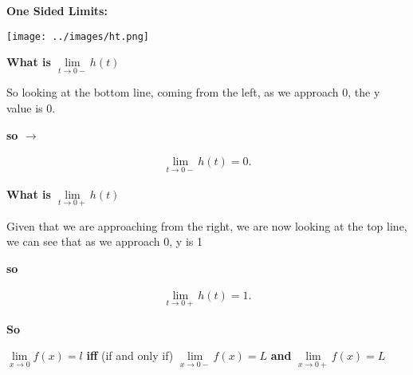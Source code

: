 \documentclass{report}
\begin{document}
    \pagebreak
    \begin{large}
        \noindent \textbf{One Sided Limits:}
    \end{large}
   
    
    \bigbreak \noindent 
    \begin{center}
        \texttt{[image: ../images/ht.png]} 
    \end{center}

    \bigbreak \noindent \bigbreak \noindent 
    \bigbreak \noindent 
    \textbf{What is $\lim\limits_{t \to 0- }{h \left(t\right)}$}

    \bigbreak \noindent 
    So looking at the bottom line, coming from the left, as we approach 0, the y value is 
    0.

    \bigbreak \noindent 
    \textbf{so $\rightarrow$}

    \begin{align*}
        \lim\limits_{t \to 0- }{h \left(t\right) = 0}
    .\end{align*}


    \bigbreak \noindent 
    \textbf{What is $\lim\limits_{t \to 0+}{h \left(t\right)}$} 

    \bigbreak \noindent 
    Given that we are approaching from the right, we are now looking at the top line, 
    we can see that as we approach 0, y is 1

    \bigbreak \noindent 
    \textbf{so}

    \begin{align*}
        \lim\limits_{t \to 0+ }{h \left(t\right) = 1}
    .\end{align*}

    \bigbreak \noindent 

    \bigbreak \noindent 
    \textbf{So}

    \bigbreak \noindent 
    $\lim\limits_{x \to 0}{f \left(x\right) = l}$ \textbf{iff} (if and only if) $\lim\limits_{x \to 0- }{f \left(x\right) = L}$ \textbf{and} $\lim\limits_{x \to 0+ }{f \left(x\right) = L}$
\end{document}
